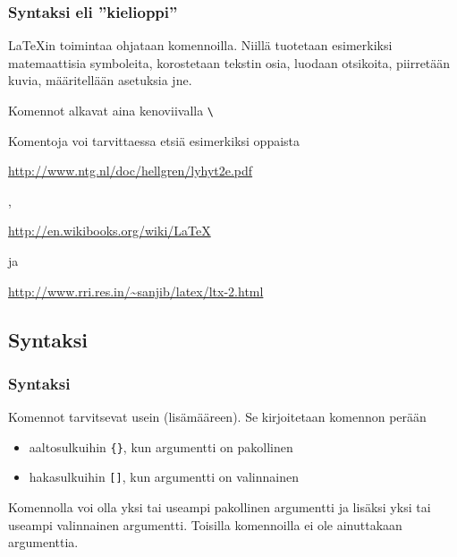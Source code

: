 \begin{fframe}
    \frametitle{Syntaksi eli ''kielioppi''}
    \LaTeX in toimintaa ohjataan komennoilla. \pause Niillä tuotetaan esimerkiksi matemaattisia symboleita, korostetaan tekstin osia, luodaan otsikoita, piirretään kuvia, määritellään asetuksia jne.  \pause
    \begin{framed}
        Komennot alkavat aina kenoviivalla \lstinline-\-
    \end{framed}
    \pause
    Komentoja voi tarvittaessa etsiä esimerkiksi oppaista \begin{scriptsize}
        \url{http://www.ntg.nl/doc/hellgren/lyhyt2e.pdf}
    \end{scriptsize},
    \begin{scriptsize}
        \url{http://en.wikibooks.org/wiki/LaTeX}
    \end{scriptsize} ja
    \begin{scriptsize}
        \url{http://www.rri.res.in/~sanjib/latex/ltx-2.html}
    \end{scriptsize}
\end{fframe}


\subsection{Syntaksi}
\begin{fframe}
    \frametitle{Syntaksi}
    Komennot tarvitsevat usein  (lisämääreen). \pause Se kirjoitetaan komennon perään
    \begin{itemize}[<+->]
        \item aaltosulkuihin \lstinline-{}-, kun argumentti on pakollinen
        \item hakasulkuihin \lstinline-[]-, kun argumentti on valinnainen
    \end{itemize}
    \pause
    Komennolla voi olla yksi tai useampi pakollinen argumentti ja lisäksi yksi tai useampi valinnainen argumentti. \pause Toisilla komennoilla ei ole ainuttakaan argumenttia.
\end{fframe}


